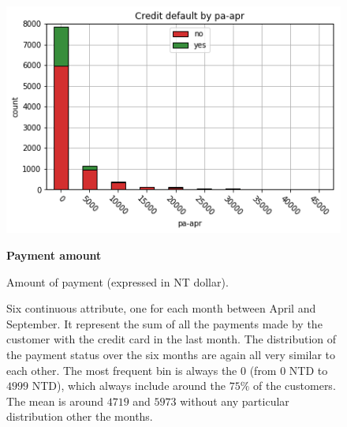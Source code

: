 \smallskip
\begin{figure}[h]
  \begin{minipage}[h]{.45\textwidth}
    \includegraphics[width=.95\textwidth]{img/ch2/payment_amount_1}
  \end{minipage}
  \begin{minipage}[h]{.55\textwidth}
        {\Large \textbf{Payment amount}}
        
        Amount of payment (expressed in NT dollar).
        
        Six continuous attribute, one for each month between April and September.
        It represent the sum of all the payments made by the customer with the credit card in the last month. The distribution of the payment status over the six months are again all very similar to each other. The most frequent bin is always the 0 (from $0$ NTD to $4999$ NTD), which always include around the $75\%$ of the customers. The mean is around $4719$ and $5973$ without any particular distribution other the months.
  \end{minipage}
\end{figure}
\smallskip
